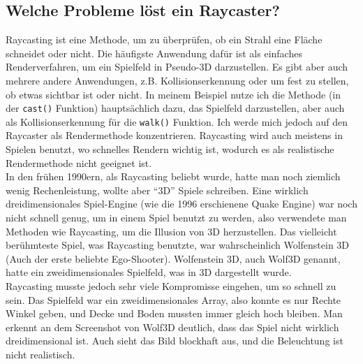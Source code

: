 \documentclass[a4paper,12pt]{report}
\begin{document}
\subsection{Welche Probleme löst ein Raycaster?}
Raycasting ist eine Methode, um zu überprüfen, ob ein Strahl eine Fläche schneidet oder nicht. Die häufigste Anwendung dafür ist als einfaches Renderverfahren, um ein Spielfeld in Pseudo-3D darzustellen. Es gibt aber auch mehrere andere Anwendungen, z.B. Kollisionserkennung oder um fest zu stellen, ob etwas sichtbar ist oder nicht. In meinem Beispiel nutze ich die Methode (in der \texttt{cast()} Funktion) hauptsächlich dazu, das Spielfeld darzustellen, aber auch als Kollisionserkennung für die \texttt{walk()} Funktion. Ich werde mich jedoch auf den Raycaster als Rendermethode konzentrieren. Raycasting wird auch meistens in Spielen benutzt, wo schnelles Rendern wichtig ist, wodurch es als realistische Rendermethode nicht geeignet ist. \\
In den frühen 1990ern, als Raycasting beliebt wurde, hatte man noch ziemlich wenig Rechenleistung, wollte aber ``3D'' Spiele schreiben. Eine wirklich dreidimensionales Spiel-Engine (wie die 1996 erschienene Quake Engine) war noch nicht schnell genug, um in einem Spiel benutzt zu werden, also verwendete man Methoden wie Raycasting, um die Illusion von 3D herzustellen. Das vielleicht berühmteste Spiel, was Raycasting benutzte, war wahrscheinlich Wolfenstein 3D (Auch der erste beliebte Ego-Shooter). Wolfenstein 3D, auch Wolf3D genannt, hatte ein zweidimensionales Spielfeld, was in 3D dargestellt wurde. \\
Raycasting musste jedoch sehr viele Kompromisse eingehen, um so schnell zu sein. Das Spielfeld war ein zweidimensionales Array, also konnte es nur Rechte Winkel geben, und Decke und Boden mussten immer gleich hoch bleiben. Man erkennt an dem Screenshot von Wolf3D deutlich, dass das Spiel nicht wirklich dreidimensional ist. Auch sieht das Bild blockhaft aus, und die Beleuchtung ist nicht realistisch.
\end{document}
